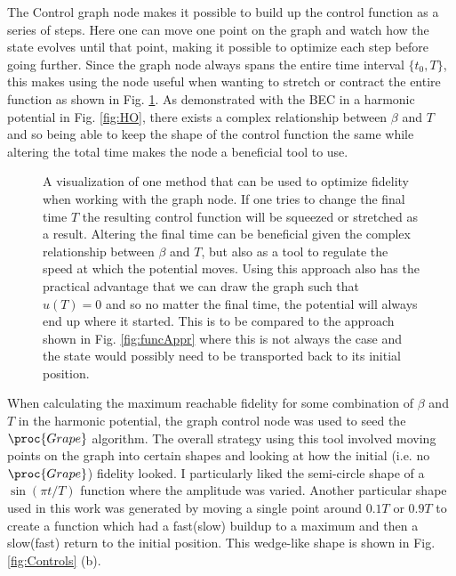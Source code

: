 \documentclass[a4paper, twocolumn]{revtex4-1}
\begin{document}
The Control graph node makes it possible to build up the control function as a series of steps. Here one can move one point on the graph and watch how the state evolves until that point, making it possible to optimize each step before going further. Since the graph node always spans the entire time interval $\{t_0,T\}$, this makes using the node useful when wanting to stretch or contract the entire function as shown in Fig. \ref{fig:graphAppr}. As demonstrated with the BEC in a harmonic potential in Fig. \ref{fig:HO}, there exists a complex relationship between $\beta$ and $T$ and so being able to keep the shape of the control function the same while altering the total time makes the node a beneficial tool to use.\\

\begin{figure}
	\def\svgwidth{\columnwidth}
	
	\caption{A visualization of one method that can be used to optimize fidelity when working with the graph node. If one tries to change the final time $T$ the resulting control function will be squeezed or stretched as a result. Altering the final time can be beneficial given the complex relationship between $\beta$ and $T$, but also as a tool to regulate the speed at which the potential moves. Using this approach also has the practical advantage that we can draw the graph such that $u(T)=0$ and so no matter the final time, the potential will always end up where it started. This is to be compared to the approach shown in Fig. \ref{fig:funcAppr} where this is not always the case and the state would possibly need to be transported back to its initial position.}
	\label{fig:graphAppr}
\end{figure}

When calculating the maximum reachable fidelity for some combination of $\beta$ and $T$ in the harmonic potential, the graph control node was used to seed the $\proc{Grape}$ algorithm. The overall strategy using this tool involved moving points on the graph into certain shapes and looking at how the initial (i.e. no $\proc{Grape}$) fidelity looked. I particularly liked the semi-circle shape of a $\sin(\pi t/T)$ function where the amplitude was varied. Another particular shape used in this work was generated by moving a single point around $0.1T$ or $0.9T$ to create a function which had a fast(slow) buildup to a maximum and then a slow(fast) return to the initial position. This wedge-like shape is shown in Fig. \ref{fig:Controls} (b).
\end{document}
